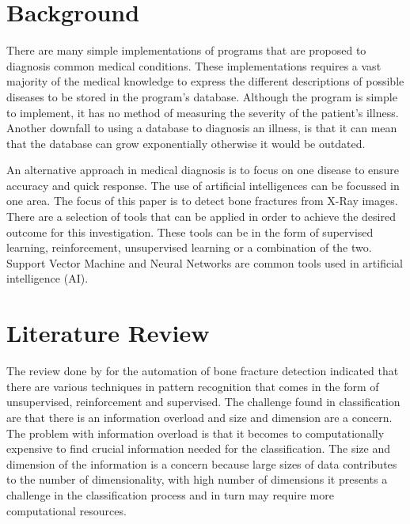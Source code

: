 \documentclass[11pt,twocolumn]{witseiepaper}
\begin{document}
	\section{Background}
	There are many simple implementations of programs that are proposed to diagnosis common medical conditions. These implementations requires a vast majority of the medical knowledge to express the different descriptions of possible diseases to be stored in the program's database. Although the program is simple to implement, it has no method of measuring the severity of the patient's illness. Another downfall to using a database to diagnosis an illness, is that it can mean that the database can grow exponentially otherwise it would be outdated. 
	
	An alternative approach in medical diagnosis is to focus on one disease to ensure accuracy and quick response. The use of artificial intelligences can be focussed in one area. The focus of this paper is to detect bone fractures from X-Ray images. There are a selection of tools that can be applied in order to achieve the desired outcome for this investigation. These tools can be in the form of supervised learning, reinforcement, unsupervised learning or a combination of the two. Support Vector Machine and Neural Networks are common tools used in artificial intelligence (AI).
		
	\section{Literature Review}
	The review done by \cite{Mahendran2011} for the automation of bone fracture detection indicated that there are various techniques in pattern recognition that comes in the form of unsupervised, reinforcement and supervised. The challenge found in classification are that there is an information overload and size and dimension are a concern. The problem with information overload is that it becomes to computationally expensive to find crucial information needed for the classification. The size and dimension of the information is a concern because large sizes of data contributes to the number of dimensionality, with high number of dimensions it presents a challenge in the classification process and in turn may require more computational resources.
	
\end{document}
